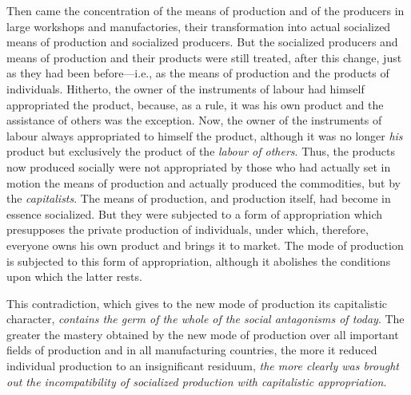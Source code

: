 Then came the concentration of the means of production and of the producers in
large workshops and manufactories, their transformation into actual socialized
means of production and socialized producers. But the socialized producers and
means of production and their products were still treated, after this change,
just as they had been before---i.e., as the means of production and the products
of individuals. Hitherto, the owner of the instruments of labour had himself
appropriated the product, because, as a rule, it was his own product and the
assistance of others was the exception. Now, the owner of the instruments of
labour always appropriated to himself the product, although it was no longer
\emph{his} product but exclusively the product of the \emph{labour of others}.
Thus, the products now produced socially were not appropriated by those who had
actually set in motion the means of production and actually produced the
commodities, but by the \emph{capitalists}. The means of production, and
production itself, had become in essence socialized. But they were subjected to
a form of appropriation which presupposes the private production of individuals,
under which, therefore, everyone owns his own product and brings it to market.
The mode of production is subjected to this form of appropriation, although it
abolishes the conditions upon which the latter rests.

This contradiction, which gives to the new mode of production its capitalistic
character, \emph{contains the germ of the whole of the social antagonisms of
today}. The greater the mastery obtained by the new mode of production over all
important fields of production and in all manufacturing countries, the more it
reduced individual production to an insignificant residuum, \emph{the more
clearly was brought out the incompatibility of socialized production with
capitalistic appropriation}.

